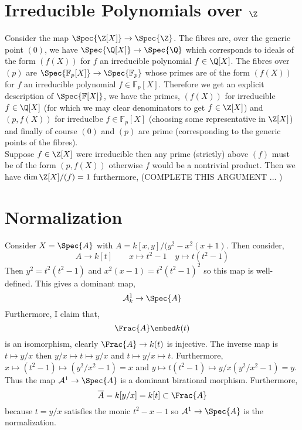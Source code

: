 \documentclass[12pt]{article}
\begin{document}
\section{Irreducible Polynomials over $\Z$}

\newcommand{\Fin}{\mathbb{F}}

Consider the map $\Spec{\Z[X]} \to \Spec{\Z}$. The fibres are, over the generic point $(0)$, we have $\Spec{\Q[X]} \to \Spec{\Q}$ which corresponds to ideals of the form $(f(X))$ for $f$ an irreducible polynomial $f \in \Q[X]$. The fibres over $(p)$ are $\Spec{\Fin_p[X]} \to \Spec{\Fin_p}$ whose primes are of the form $(f(X))$ for $f$ an irreducible polynomial $f \in \Fin_p[X]$. Therefore we get an explicit description of $\Spec{\Fin[X]}$, we have the primes, $(f(X))$ for irreducible $f \in \Q[X]$ (for which we may clear denominators to get $f \in \Z[X]$) and $(p, f(X))$ for irreduclbe $f \in \Fin_p[X]$ (choosing some representative in $\Z[X]$) and finally of course $(0)$ and $(p)$ are prime (corresponding to the generic points of the fibres). 
\bigskip\\
Suppose $f \in \Z[X]$ were irreducible then any prime (strictly) above $(f)$ must be of the form $(p, f(X))$ otherwise $f$ would be a nontrivial product. Then we have $\dim{\Z[X]/(f)} = 1$ furthermore, (COMPLETE THIS ARGUMENT ... )

\section{Normalization}

\begin{example}
Consider $X = \Spec{A}$ with $A = k[x,y]/(y^2 - x^2(x + 1)$. Then consider,
\[ A \to k[t] \quad \quad x \mapsto t^2 - 1 \quad y \mapsto t(t^2 - 1) \]
Then $y^2 = t^2 (t^2 - 1)$ and $x^2 (x - 1) = t^2 (t^2 - 1)^2$ so this map is well-defined. This gives a dominant map,
\[ \A^1_k \to \Spec{A} \]
Furthermore, I claim that,
\[ \Frac{A} \embed k(t) \]
is an isomorphism, clearly $\Frac{A} \to k(t)$ is injective. The inverse map is $t \mapsto y/x$ then $y/x \mapsto t \mapsto y/x$ and $t \mapsto y/x \mapsto t$. Furthermore, $x \mapsto (t^2 - 1) \mapsto (y^2/x^2 - 1) = x$ and $y \mapsto t(t^2 -1) \mapsto y/x(y^2/x^2 - 1) = y$. Thus the map $\A^1 \to \Spec{A}$ is a dominant birational morphism. Furthermore,
\[ \overline{A} = k[y/x]  = k[t] \subset \Frac{A} \]
because $t = y/x$ satisfies the monic $t^2 - x - 1$ so $\A^1 \to \Spec{A}$ is the normalization.
\end{example}
\end{document}
